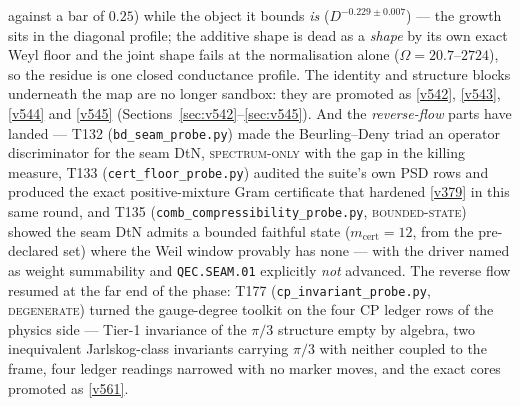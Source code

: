 \documentclass[11pt,a4paper]{article}
\begin{document}
against a bar of $0.25$) while the object it bounds \emph{is} ($D^{-0.229\pm0.007}$) --- the growth
sits in the diagonal profile; the additive shape is dead as a \emph{shape} by its own exact Weyl
floor and the joint shape fails at the normalisation alone ($\Omega=20.7$--$2724$), so the residue
is one closed conductance profile. The identity and structure
blocks underneath the map are no longer sandbox: they are promoted as \vref{v542}, \vref{v543},
\vref{v544} and \vref{v545} (Sections~\ref{sec:v542}--\ref{sec:v545}). And the \emph{reverse-flow} parts have landed --- T132
(\texttt{bd\_seam\_probe.py}) made the Beurling--Deny triad an operator discriminator for
the seam DtN, \textsc{spectrum-only} with the gap in the killing measure, T133
(\texttt{cert\_floor\_probe.py}) audited the suite's own PSD rows and produced the exact
positive-mixture Gram certificate that hardened \vref{v379} in this same round, and T135
(\texttt{comb\_compressibility\_probe.py}, \textsc{bounded-state}) showed the seam DtN
admits a bounded faithful state ($m_{\mathrm{cert}}=12$, from the pre-declared set) where
the Weil window provably has none --- with the driver named as weight summability and
\texttt{QEC.SEAM.01} explicitly \emph{not} advanced. The reverse flow resumed at the far end
of the phase: T177 (\texttt{cp\_invariant\_probe.py}, \textsc{degenerate}) turned the
gauge-degree toolkit on the four CP ledger rows of the physics side --- Tier-1 invariance of
the $\pi/3$ structure empty by algebra, two inequivalent Jarlskog-class invariants carrying
$\pi/3$ with neither coupled to the frame, four ledger readings narrowed with no marker
moves, and the exact cores promoted as \vref{v561}.
\end{document}
